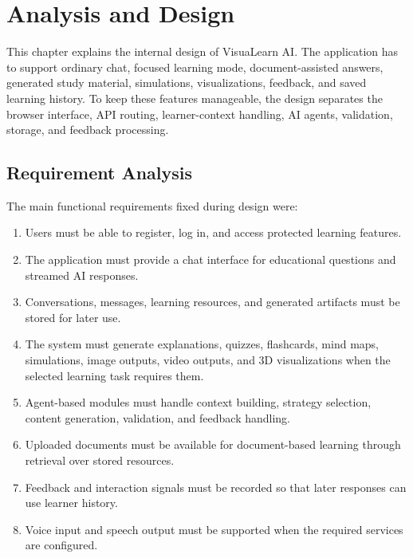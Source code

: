 \chapter{Analysis and Design}

This chapter explains the internal design of VisuaLearn AI. The application has to support ordinary chat, focused learning mode, document-assisted answers, generated study material, simulations, visualizations, feedback, and saved learning history. To keep these features manageable, the design separates the browser interface, API routing, learner-context handling, AI agents, validation, storage, and feedback processing.

\section{Requirement Analysis}

The main functional requirements fixed during design were:
\begin{enumerate}[leftmargin=1.2cm]
\item Users must be able to register, log in, and access protected learning features.
\item The application must provide a chat interface for educational questions and streamed AI responses.
\item Conversations, messages, learning resources, and generated artifacts must be stored for later use.
\item The system must generate explanations, quizzes, flashcards, mind maps, simulations, image outputs, video outputs, and 3D visualizations when the selected learning task requires them.
\item Agent-based modules must handle context building, strategy selection, content generation, validation, and feedback handling.
\item Uploaded documents must be available for document-based learning through retrieval over stored resources.
\item Feedback and interaction signals must be recorded so that later responses can use learner history.
\item Voice input and speech output must be supported when the required services are configured.
\end{enumerate}

